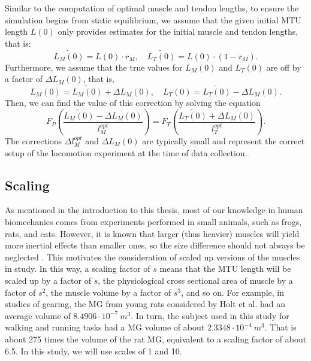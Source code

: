 \documentclass{sfuthesis}
\numberwithin{equation}{section}
\numberwithin{figure}{chapter}
\numberwithin{table}{chapter}
\theoremstyle{definition}
\begin{document}
Similar to the computation of optimal muscle and tendon lengths, to ensure the simulation begins from static equilibrium, we assume that the given initial MTU length $L(0)$ only provides estimates for the initial muscle and tendon lengths, that is:
\begin{equation}
    \widetilde{L_M(0)} = L(0) \cdot r_M, \quad \widetilde{L_T(0)} = L(0) \cdot (1-r_M).
\end{equation}
Furthermore, we assume that the true values for $L_M(0)$ and $L_T(0)$ are off by a factor of $\Delta L_M(0)$, that is, 
\begin{equation}
    L_M(0) =  \widetilde{L_M(0)} + \Delta L_M(0), \quad L_T(0) = \widetilde{L_T(0)} - \Delta L_M(0).
\end{equation}
Then, we can find the value of this correction by solving the equation
\begin{equation} \label{eq:calibration_2}
    F_P \left( \dfrac{\widetilde{L_M(0)} - \Delta L_M(0)}{l_M^{opt}}\right) = F_T \left( \dfrac{\widetilde{L_T(0)} + \Delta L_M(0)}{l_T^{opt}}\right).
\end{equation}
The corrections $\Delta l_M^{opt}$ and $\Delta L_M(0)$ are typically small and represent the correct setup of the locomotion experiment at the time of data collection.

\subsection{Scaling}

As mentioned in the introduction to this thesis, most of our knowledge in human biomechanics comes from experiments performed in small animals, such as frogs, rats, and cats. 
However, it is known that larger (thus heavier) muscles will yield more inertial effects than smaller ones, so the size difference should not always be neglected \cite{EvanThesis,Ross2018}. This motivates the consideration of scaled up versions of the muscles in study. In this way, a scaling factor of $s$ means that the MTU length will be scaled up by a factor of $s$, the physiological cross sectional area of muscle by a factor of $s^2$, the muscle volume by a factor of $s^3$, and so on. For example, in studies of gearing, the MG from young rats considered by Holt et al. \cite{Holt2016} had an average volume of $8.4906 \cdot 10^{-7} \ m^3$. In turn, the subject used in this study for walking and running tasks had a MG volume of about $2.3348 \cdot 10^{-4} \ m^3$. That is about 275 times the volume of the rat MG, equivalent to a scaling factor of about 6.5. In this study, we will use scales of 1 and 10.
\end{document}
